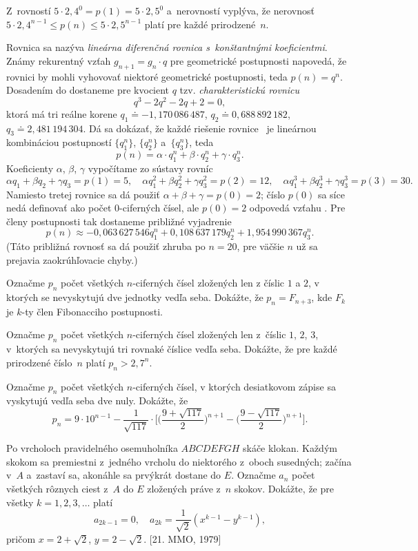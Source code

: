 {Z~rovností $5\cdot2{,}4^0=p(1)=5\cdot2{,}5^0$ a~nerovností  vyplýva, že nerovnosť
$5\cdot2{,}4^{n-1}\le p(n)\le5\cdot2{,}5^{n-1}$
platí pre každé prirodzené~$n$.

\poznamka
Rovnica  sa nazýva {\it lineárna diferenčná rovnica s~konštantnými koeficientmi}. Známy rekurentný vzťah $g_{n+1}=g_n\cdot q$
pre geometrické postupnosti napovedá, že rovnici  by mohli vyhovovať
niektoré geometrické postupnosti, teda $p(n)=q^n$.
Dosadením do  dostaneme pre kvocient $q$ tzv.
{\it charakteristickú rovnicu}
$$
q^3-2q^2-2q+2=0,
$$
ktorá má tri reálne korene $q_1\doteq-1{,}170\,086\,487$, $q_2\doteq0{,}688\,892\,182$,
$q_3\doteq2{,}481\,194\,304$. Dá sa dokázať, že každé
riešenie rovnice~ je lineárnou kombináciou postupností $\{q_1^n\}$,
$\{q_2^n\}$ a~$\{q_3^n\}$, teda
$$
p(n)=\alpha\cdot q_1^n+\beta\cdot q_2^n+\gamma\cdot q_3^n.
$$
Koeficienty $\alpha$, $\beta$, $\gamma$ vypočítame zo sústavy rovníc
$$
\alpha q_1+\beta q_2+\gamma q_3=p(1)=5,\quad \alpha q_1^2+\beta q_2^2+\gamma
q_3^2=p(2)=12,\quad
\alpha q_1^3+\beta q_2^3+\gamma q_3^3=p(3)=30.
$$
Namiesto tretej rovnice sa dá použiť $\alpha+\beta+\gamma=p(0)=2$; číslo $p(0)$ sa síce nedá definovať ako počet $0$-ciferných čísel,
ale $p(0)=2$ odpovedá vzťahu .
Pre členy postupnosti tak dostaneme približné vyjadrenie
$$
p(n)\approx-0{,}063\,627\,546q_1^n+0{,}108\,637\,179q_2^n+1{,}954\,990\,367q_3^n.
$$
(Táto približná rovnosť sa dá použiť zhruba po $n=20$, pre väčšie $n$ už sa prejavia zaokrúhľovacie chyby.)

Označme $p_n$ počet všetkých $n$-ciferných čísel zložených len z číslic $1$ a $2$, v ktorých se nevyskytujú dve jednotky vedľa seba. Dokážte, že $p_n=F_{n+3}$, kde $F_k$ je $k$-ty člen Fibonacciho postupnosti.

Označme $p_n$ počet všetkých $n$-ciferných čísel zložených len z~číslic $1$, $2$, $3$, v~ktorých sa nevyskytujú tri rovnaké číslice vedľa seba. Dokážte, že pre každé prirodzené číslo~$n$ platí $p_n>2{,}7^n$.

Označme $p_n$ počet všetkých $n$-ciferných čísel, v ktorých desiatkovom zápise sa vyskytujú vedľa seba dve nuly. Dokážte, že
$$
p_n=9\cdot10^{n-1}-\frac1{\sqrt{117}}\cdot
\biggl[\biggl(\frac{9+\sqrt{117}}2\biggr)^{\!n+1}
-\biggl(\frac{9-\sqrt{117}}2\biggr)^{\!n+1}\biggr].
$$

\D
Po vrcholoch pravidelného osemuholníka $ABCDEFGH$ skáče klokan. Každým skokom sa premiestni z~jedného vrcholu do niektorého z~oboch susedných; začína v~$A$ a~zastaví sa, akonáhle sa prvýkrát dostane do $E$. Označme $a_n$ počet všetkých rôznych ciest z~$A$ do $E$ zložených práve z~$n$ skokov. Dokážte, že pre všetky $k=1, 2, 3,\dots$
platí
$$
a_{2k-1}=0,\quad a_{2k}=\frac1{\sqrt2}(x^{k-1}-y^{k-1}),
$$
pričom $x=2+\sqrt2$, $y=2-\sqrt2$.
[21. MMO, 1979]
}

